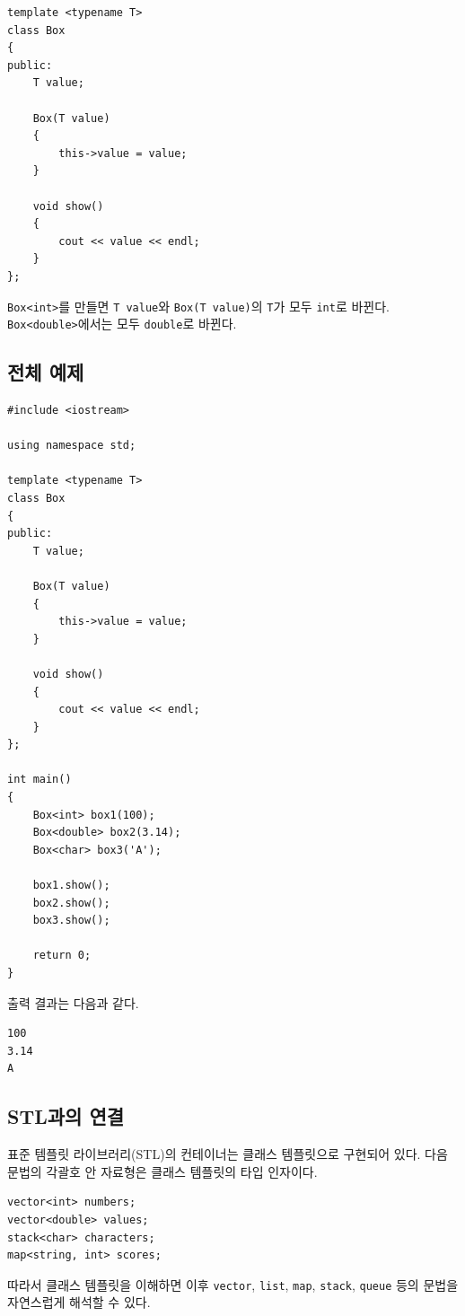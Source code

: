 \documentclass[11pt,a4paper]{article}
\begin{document}
\begin{lstlisting}
template <typename T>
class Box
{
public:
    T value;

    Box(T value)
    {
        this->value = value;
    }

    void show()
    {
        cout << value << endl;
    }
};
\end{lstlisting}

\texttt{Box<int>}를 만들면 \texttt{T value}와 \texttt{Box(T value)}의 \texttt{T}가 모두 \texttt{int}로 바뀐다. \texttt{Box<double>}에서는 모두 \texttt{double}로 바뀐다.

\subsection{전체 예제}
\begin{lstlisting}
#include <iostream>

using namespace std;

template <typename T>
class Box
{
public:
    T value;

    Box(T value)
    {
        this->value = value;
    }

    void show()
    {
        cout << value << endl;
    }
};

int main()
{
    Box<int> box1(100);
    Box<double> box2(3.14);
    Box<char> box3('A');

    box1.show();
    box2.show();
    box3.show();

    return 0;
}
\end{lstlisting}

출력 결과는 다음과 같다.

\begin{verbatim}
100
3.14
A
\end{verbatim}

\subsection{STL과의 연결}
표준 템플릿 라이브러리(STL)의 컨테이너는 클래스 템플릿으로 구현되어 있다. 다음 문법의 각괄호 안 자료형은 클래스 템플릿의 타입 인자이다.

\begin{lstlisting}
vector<int> numbers;
vector<double> values;
stack<char> characters;
map<string, int> scores;
\end{lstlisting}

따라서 클래스 템플릿을 이해하면 이후 \texttt{vector}, \texttt{list}, \texttt{map}, \texttt{stack}, \texttt{queue} 등의 문법을 자연스럽게 해석할 수 있다.
\end{document}
